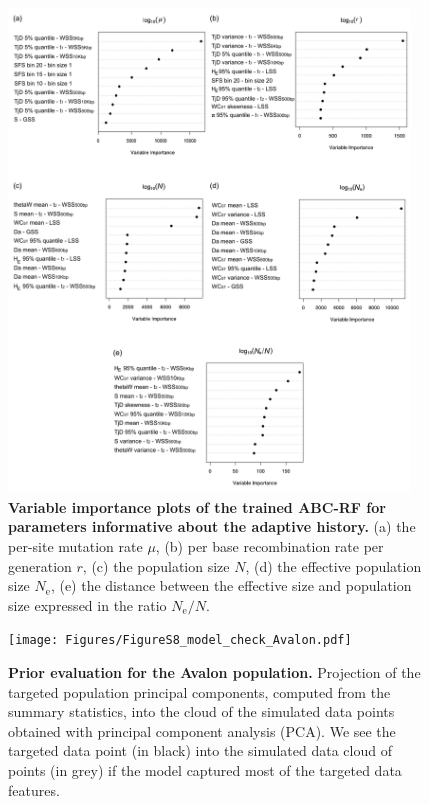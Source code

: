 \documentclass[a4paper, 12pt]{article}
\begin{document}
\begin{figure}[ht]
 \centering
 \includegraphics[width=0.95\textwidth]{Figures/FigureS7_varplot_demography.pdf}
 \small\caption{\textbf{Variable importance plots of the trained ABC-RF for parameters informative about the adaptive history.} (a) the per-site mutation rate $\mu$, (b) per base recombination rate per generation $r$, (c) the population size $N$, (d) the effective population size $N_{\mathrm{e}}$, (e) the distance between the effective size and population size expressed in the ratio $N_{\mathrm{e}}/N$.}
 \label{fig:supple_pods_varplots_demo}
\end{figure}

\begin{figure}[ht]
  \centering
  \texttt{[image: Figures/FigureS8\_model\_check\_Avalon.pdf]}
  \small\caption{\textbf{Prior evaluation for the Avalon population.} Projection of the targeted population principal components, computed from the summary statistics, into the cloud of the simulated data points obtained with principal component analysis (PCA). We see the targeted data point (in black) into the simulated data cloud of points (in grey) if the model captured most of the targeted data features.}
  \label{fig:supple_model_check_avalon}
\end{figure}
\end{document}
